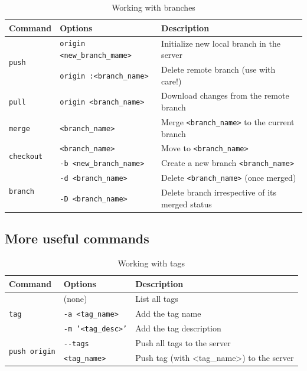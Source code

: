 \documentclass[a4paper,10pt]{article}
\begin{document}
\begin{table}[h]
\caption{Working with branches}
\centering
\begin{tabular}{l l l}
\hline\hline
Command & Options & Description \\
\hline\hline
\multirow{2}{*}{\texttt{push}} & \texttt{origin <new\_branch\_mame>} & Initialize new local branch in the server \\
& \texttt{origin :<branch\_name>} & Delete remote branch (use with care!) \\ \hline
\multirow{1}{*}{\texttt{pull}} & \texttt{origin <branch\_name>} & Download changes from the remote branch  \\ \hline
\multirow{1}{*}{\texttt{merge}} & \texttt{<branch\_name>} & Merge \texttt{<branch\_name>} to the current branch \\ \hline
\multirow{2}{*}{\texttt{checkout}} & \texttt{<branch\_name>} & Move to \texttt{<branch\_name>}  \\
& \texttt{-b <new\_branch\_name>} & Create a new branch \texttt{<branch\_name>} \\ \hline
\multirow{2}{*}{\texttt{branch}} & \texttt{-d <branch\_name>} & Delete \texttt{<branch\_name>} (once merged) \\
& \texttt{-D <branch\_name>} & Delete branch irrespective of its merged status \\ \hline
\hline
\end{tabular}
\end{table}

\subsection{More useful commands}

\begin{table}[h]
\caption{Working with tags}
\centering
\begin{tabular}{l l l}
\hline\hline
Command & Options & Description \\
\hline\hline
\multirow{3}{*}{\texttt{tag}} & (none) & List all tags \\
 & \texttt{-a <tag\_name>} & Add the tag name \\
 & \texttt{-m '<tag\_desc>'} & Add the tag description \\ \hline
\multirow{2}{*}{\texttt{push origin}} & \texttt{-{}-tags} & Push all tags to the server \\
 & \texttt{<tag\_name>} & Push tag (with <tag\_name>) to the server \\ \hline
\hline
\end{tabular}
\end{table}
\end{document}

